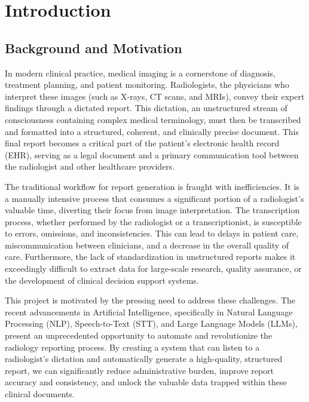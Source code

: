 \chapter{Introduction}
\label{cha:introduction}

\section{Background and Motivation}

In modern clinical practice, medical imaging is a cornerstone of diagnosis, treatment planning, and patient monitoring. Radiologists, the physicians who interpret these images (such as X-rays, CT scans, and MRIs), convey their expert findings through a dictated report. This dictation, an unstructured stream of consciousness containing complex medical terminology, must then be transcribed and formatted into a structured, coherent, and clinically precise document. This final report becomes a critical part of the patient's electronic health record (EHR), serving as a legal document and a primary communication tool between the radiologist and other healthcare providers.

The traditional workflow for report generation is fraught with inefficiencies. It is a manually intensive process that consumes a significant portion of a radiologist's valuable time, diverting their focus from image interpretation. The transcription process, whether performed by the radiologist or a transcriptionist, is susceptible to errors, omissions, and inconsistencies. This can lead to delays in patient care, miscommunication between clinicians, and a decrease in the overall quality of care. Furthermore, the lack of standardization in unstructured reports makes it exceedingly difficult to extract data for large-scale research, quality assurance, or the development of clinical decision support systems.

This project is motivated by the pressing need to address these challenges. The recent advancements in Artificial Intelligence, specifically in Natural Language Processing (NLP), Speech-to-Text (STT), and Large Language Models (LLMs), present an unprecedented opportunity to automate and revolutionize the radiology reporting process. By creating a system that can listen to a radiologist's dictation and automatically generate a high-quality, structured report, we can significantly reduce administrative burden, improve report accuracy and consistency, and unlock the valuable data trapped within these clinical documents.

